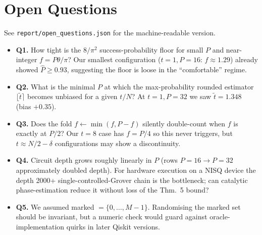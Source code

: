 \documentclass[11pt]{article}
\begin{document}
\section*{Open Questions}
See \texttt{report/open\_questions.json} for the machine-readable version.

\begin{itemize}
\item \textbf{Q1.} How tight is the $8/\pi^2$ success-probability floor for
   small $P$ and near-integer $f = P\theta/\pi$? Our smallest configuration
   ($t=1, P=16$: $f\approx 1.29$) already showed $\hat P \geq 0.93$,
   suggesting the floor is loose in the ``comfortable'' regime.
\item \textbf{Q2.} What is the minimal $P$ at which the max-probability
   rounded estimator $\lfloor \tilde t\rceil$ becomes unbiased for a given
   $t/N$? At $t=1, P=32$ we saw $\tilde t = 1.348$ (bias $+0.35$).
\item \textbf{Q3.} Does the fold $f \gets \min(f, P-f)$ silently double-count
   when $f$ is exactly at $P/2$? Our $t=8$ case has $f = P/4$ so this
   never triggers, but $t \approx N/2 - \delta$ configurations may show
   a discontinuity.
\item \textbf{Q4.} Circuit depth grows roughly linearly in $P$ (rows
   $P=16 \to P=32$ approximately doubled depth). For hardware execution
   on a NISQ device the depth 2000+ single-controlled-Grover chain is the
   bottleneck; can catalytic phase-estimation reduce it without loss of
   the Thm.~5 bound?
\item \textbf{Q5.} We assumed marked $= \{0,\ldots,M-1\}$. Randomising the
   marked set should be invariant, but a numeric check would guard
   against oracle-implementation quirks in later Qiskit versions.
\end{itemize}
\end{document}
